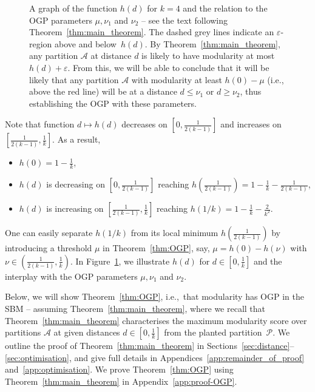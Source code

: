 \documentclass[a4paper,UKenglish,cleveref, autoref, thm-restate,numberwithinsect]{lipics-v2021}
\newcommand{\cA}{\mathcal{A}}
\newcommand{\cP}{\mathcal{P}}
\newcommand{\eps}{\varepsilon}
\begin{document}
\begin{figure}
\begin{center}
\caption{A graph of the function $h(d)$ for $k=4$ and the relation to the OGP parameters $\mu, \nu_1$ and $\nu_2$ -- see the text following Theorem~\ref{thm:main_theorem}. The dashed grey lines indicate an $\eps$-region above and below~$h(d)$. By Theorem~\ref{thm:main_theorem}, any partition $\cA$ at distance $d$ is likely to have modularity at most $h(d)+\eps$. From this, we will be able to conclude that it will be likely that any partition $\cA$ with modularity at least $h(0)-\mu$ (i.e., above the red line)  will be at a distance $d\leq \nu_1$ or $d\geq \nu_2$, thus establishing the OGP with these parameters.}\label{fig:functions_h_new}
\end{center}
\end{figure}




Note that function $d\mapsto h(d)$ decreases on $\left[0, \frac {1}{2(k-1)}\right]$ and increases on $\left[\frac {1}{2(k-1)},\frac{1}{k}\right]$. As a result, 
\begin{itemize}
\item $h(0) = 
1 - \frac {1}{k}$, 
\item $%
h(d)$  
is decreasing on $[0, \frac {1}{2(k-1)}]$ reaching $h\left(\frac {1}{2(k-1)}\right) = 
1 - \frac {1}{k} - \frac {1}{2(k-1)}$,
\item $%
h(d)$ is increasing on $[\frac {1}{2(k-1)},\frac{1}{k}]$ reaching $h(1/k) = 
1 - \frac {1}{k} - \frac {2}{k^2}$.
\end{itemize}

One can easily separate $h(1/k)$ from its local minimum $h(\frac {1}{2(k-1)})$ by introducing a threshold $\mu$ in Theorem~\ref{thm:OGP}, say, $\mu = %
h(0)-h(\nu)$ with $\nu\in \left(\frac{1}{2(k-1)}, \frac{1}{k}\right)$. In Figure~\ref{fig:functions_h_new}, we illustrate $h(d)$ for $d\in[0,\frac{1}{k}]$ and the interplay with the OGP parameters $\mu, \nu_1$ and $\nu_2$.   %

Below, we will show Theorem~\ref{thm:OGP}, i.e.,\ that modularity has OGP in the SBM -- assuming Theorem~\ref{thm:main_theorem}, where we recall that Theorem~\ref{thm:main_theorem} characterises the maximum modularity score over partitions $\cA$ at given distances $d\in [0,\frac{1}{k}]$ from the planted partition~$\cP$. We outline the proof of Theorem~\ref{thm:main_theorem} in Sections~\ref{sec:distance}--\ref{sec:optimisation}, and give full details in Appendices~\ref{app:remainder_of_proof} and~\ref{app:optimisation}. We prove Theorem~\ref{thm:OGP} using Theorem~\ref{thm:main_theorem} in Appendix~\ref{app:proof-OGP}. 
\end{document}
